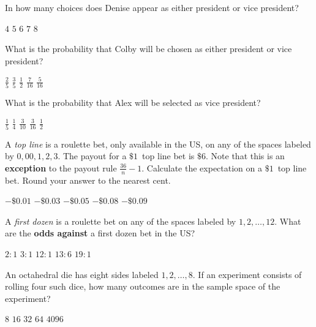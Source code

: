 \documentclass[12pt]{exam}
\begin{document}
\begin{questions}
\question
In how many choices does Denise appear as either president
or vice president?\\
\begin{oneparchoices}
\correctchoice $4$
\choice $5$ %
\choice $6$ %
\choice $7$
\choice $8$
\end{oneparchoices}

\question
What is the probability that Colby will be chosen
as either president or vice president?\\
\begin{oneparchoices}
\choice $\frac{2}{5}$ %
\correctchoice $\frac{3}{5}$
\choice $\frac{1}{2}$ %
\choice $\frac{7}{16}$ %
\choice $\frac{5}{16}$ %
\end{oneparchoices}

\question\label{LastPresident}
What is the probability that Alex will be selected
as vice president?\\
\begin{oneparchoices}
\correctchoice $\frac{1}{5}$
\choice $\frac{1}{4}$ %
\choice $\frac{3}{10}$ %
\choice $\frac{3}{16}$ %
\choice $\frac{1}{2}$ %
\end{oneparchoices}

\question A {\em top line} is a roulette bet,
only available in the US, on any of the spaces labeled by
$0,00,1,2,3$. The payout for a $\$1$~top line bet
is $\$6$.
Note that this is an {\bf exception} to the
payout rule $\frac{36}{n}-1$.
Calculate the expectation on a $\$1$~top line bet.
Round your answer to the nearest cent.\\
\begin{oneparchoices}
\choice $-\$0.01$
\choice $-\$0.03$ %
\choice $-\$0.05$ %
\correctchoice $-\$0.08$
\choice $-\$0.09$
\end{oneparchoices}

\question A {\em first dozen} is a roulette bet
on any of the spaces labeled by $1,2,\ldots,12$. What are the
{\bf odds against} a first dozen bet in the US?\\
\begin{oneparchoices}
\choice $2:1$ %
\choice $3:1$ %
\choice $12:1$ %
\correctchoice $13:6$
\choice $19:1$ %
\end{oneparchoices}

\question An octahedral die has eight sides labeled $1,2,\ldots,8$.
If an experiment consists of rolling four such dice, how
many outcomes are in the sample space of the experiment?\\
\begin{oneparchoices}
\choice $8$ %
\choice $16$
\choice $32$ %
\choice $64$ %
\correctchoice $4096$
\end{oneparchoices}

\end{questions}
\end{document}
